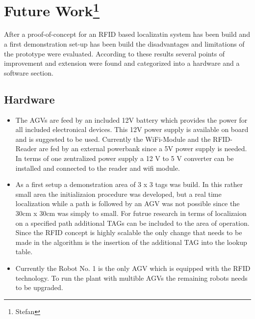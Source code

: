 
\section[Future Work]{Future Work\footnote{Stefan}} \label{Sec_fut}
After a proof-of-concept for an RFID based localizatin system has been build and a first demonstration set-up has been build the disadvantages and limitations of the prototype were evaluated. According to these results several points of improvement and extension were found and categorized into a hardware and a software section. 
\subsection{Hardware}
\begin{itemize}
\item The AGVs are feed by an included 12V battery which provides the power for all included electronical devices. This 12V power supply is available on board and is suggested to be used. Currently the WiFi-Module and the RFID-Reader are fed by an external powerbank since a 5V power supply is needed. In terms of one zentralized power supply a 12 V to 5 V converter can be installed and connected to the reader and wifi module.
\item As a first setup a demonstration area of 3 x 3 tags was build. In this rather small area the initializaion procedure was developed, but a real time localization while a path is followed by an AGV was not possible since the 30cm x 30cm was simply to small. For futrue research in terms of localizaion on a specified path additional TAGs can be included to the area of operation. Since the RFID concept is highly scalable the only change that needs to be made in the algorithm is the insertion of the additional TAG into the lookup table.
\item Currently the Robot No. 1 is the only AGV which is equipped with the RFID technology. To run the plant with multible AGVs the remaining robots needs to be upgraded.\\
\end{itemize}
